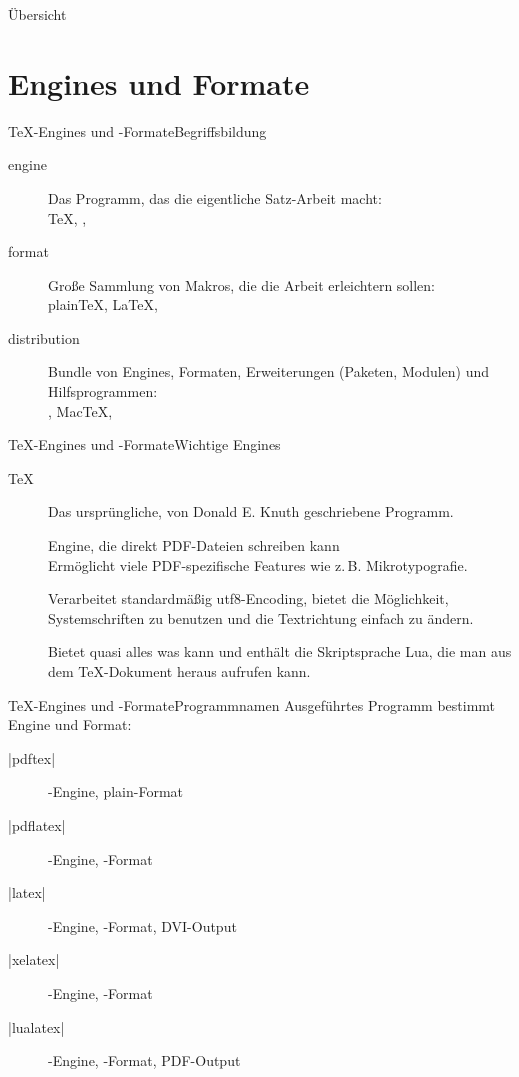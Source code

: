\documentclass[
	vorläufig=true,
	datum=2016-10-28,
	titel={Allgemeine Formatierung und Pakete},
	web=true,
]{../tex/latexkurs-slides}
\begin{document}
\begin{frame}{Übersicht}
	\tableofcontents
\end{frame}

\section{Engines und Formate}
\begin{frame}{\TeX-Engines und -Formate}{Begriffsbildung}
	\begin{description}
		\item[engine] Das Programm, das die eigentliche Satz-Arbeit macht:\\\TeX, , \luaTeX
		\item[format] Große Sammlung von Makros, die die Arbeit erleichtern sollen:\\plain\TeX, \LaTeX, 
		\item[distribution] Bundle von Engines, Formaten, Erweiterungen (Paketen, Modulen) und Hilfsprogrammen:\\\TeXlive, Mac\TeX, \MikTeX
	\end{description}
\end{frame}

\begin{frame}{\TeX-Engines und -Formate}{Wichtige Engines}
	\begin{description}
		\item[\TeX] Das ursprüngliche, von Donald E. Knuth geschriebene Programm.
		\item[] Engine, die direkt PDF-Dateien schreiben kann\\Ermöglicht viele PDF-spezifische Features wie z.\,B. Mikrotypografie.
		\item[\XeTeX] Verarbeitet standardmäßig utf8-Encoding, bietet die Möglichkeit, Systemschriften zu benutzen und die Textrichtung einfach zu ändern.
		\item[\luaTeX] Bietet quasi alles was \XeTeX kann und enthält die Skriptsprache Lua, die man aus dem \TeX-Dokument heraus aufrufen kann.
	\end{description}
\end{frame}

\begin{frame}[fragile]{\TeX-Engines und -Formate}{Programm\/namen}
	Ausgeführtes Programm bestimmt Engine und Format:\\[1em]
	\begin{description}
		\item[|pdftex|] -Engine, plain-Format
		\item[|pdflatex|] -Engine, \LaTeXe-Format
		\item[|latex|] -Engine, \LaTeXe-Format, DVI-Output
		\item[|xelatex|] \XeTeX-Engine, \LaTeXe-Format
		\item[|lualatex|] \luaTeX-Engine, \LaTeXe-Format, PDF-Output
	\end{description}
\end{frame}
\end{document}
